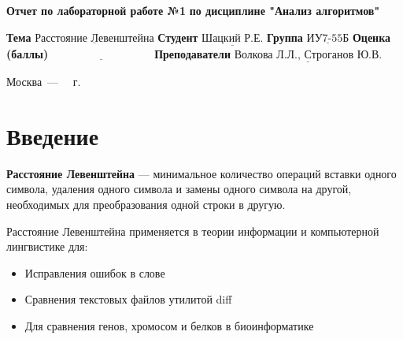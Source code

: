 \documentclass[12pt]{report}
\begin{document}
\begin{titlepage}
        \begin{center}
            \noindent\begin{minipage}{1.3\textwidth}
                         \centering
                         \Large\textbf{  Отчет по лабораторной работе №1}\newline
                         \textbf{по дисциплине "Анализ алгоритмов"}\newline\newline
            \end{minipage}
        \end{center}

        \noindent\textbf{Тема} $\underline{\text{Расстояние Левенштейна}}$\newline\newline
        \noindent\textbf{Студент} $\underline{\text{Шацкий Р.Е.}}$\newline\newline
        \noindent\textbf{Группа} $\underline{\text{ИУ7-55Б}}$\newline\newline
        \noindent\textbf{Оценка (баллы)} $\underline{\text{~~~~~~~~~~~~~~~~~~~~~~~~~~~}}$\newline\newline
        \noindent\textbf{Преподаватели} $\underline{\text{Волкова Л.Л., Строганов Ю.В.}}$\newline\newline\newline

        \begin{center}
            \vfill
            Москва~---~\the\year
            ~г.
        \end{center}
    \end{titlepage}

    \tableofcontents

    \newpage
    \chapter*{Введение}
    \textbf{Расстояние Левенштейна} --- минимальное количество операций вставки одного символа, удаления одного символа
    и замены одного символа на другой, необходимых для преобразования одной строки в другую.

    Расстояние Левенштейна применяется в теории информации и компьютерной лингвистике для:
    \begin{itemize}
        \item Исправления ошибок в слове
        \item Сравнения текстовых файлов утилитой diff
        \item Для сравнения генов, хромосом и белков в биоинформатике
    \end{itemize}
\end{document}
